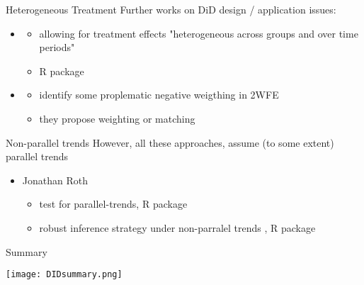 \documentclass[aspectratio=169]{beamer}
\begin{document}
		\begin{frame}{Heterogeneous Treatment}
			Further works on DiD design / application issues:
			\\ \vspace*{.25cm}
			\begin{itemize}
				\item \cite{DeChaisemartin2018}
				\begin{itemize}
					\item allowing for treatment effects "heterogeneous across groups and over time periods"
					\item R package \href{https://cran.r-project.org/web/packages/DIDmultiplegt/index.html}{\underline{}}
				\end{itemize}
				\item \cite{Imai2020}
				\begin{itemize}
					\item identify some proplematic negative weigthing in 2WFE
					\item they propose weighting or matching \href{https://imai.fas.harvard.edu/research/twoway.html}{\underline{}}
				\end{itemize}
			\end{itemize}
		\end{frame}

		\begin{frame}{Non-parallel trends}
			However, all these approaches, assume (to some extent) parallel trends
			\\ \vspace*{.25cm}
			\begin{itemize}
				\item Jonathan Roth \citeyear{Roth2021}
					\begin{itemize}
						\item test for parallel-trends, R package \href{https://github.com/jonathandroth/pretrends}{\underline{}}
						\item robust inference strategy under non-parralel trends \cite{Rambachan2020}, R package \href{https://github.com/asheshrambachan/HonestDiD}{\underline{}}
					\end{itemize}
			\end{itemize}
		\end{frame}

		\begin{frame}{Summary}
			\begin{center}
				\texttt{[image: DIDsummary.png]}
			\end{center}
		\end{frame}
\end{document}
